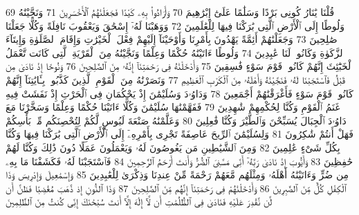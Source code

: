 {\tiny\colorbox{cl_aya}{69}} قُلْنَا يَٰنَارُ كُونِى بَرْدًا وَسَلَٰمًا عَلَىٰٓ إِبْرَٰهِيمَ
{\tiny\colorbox{cl_aya}{70}} وَأَرَادُوا۟ بِهِۦ كَيْدًا فَجَعَلْنَٰهُمُ ٱلْأَخْسَرِينَ
{\tiny\colorbox{cl_aya}{71}} وَنَجَّيْنَٰهُ وَلُوطًا إِلَى ٱلْأَرْضِ ٱلَّتِى بَٰرَكْنَا فِيهَا لِلْعَٰلَمِينَ
{\tiny\colorbox{cl_aya}{72}} وَوَهَبْنَا لَهُۥٓ إِسْحَٰقَ وَيَعْقُوبَ نَافِلَةً وَكُلًّا جَعَلْنَا صَٰلِحِينَ
{\tiny\colorbox{cl_aya}{73}} وَجَعَلْنَٰهُمْ أَئِمَّةً يَهْدُونَ بِأَمْرِنَا وَأَوْحَيْنَآ إِلَيْهِمْ فِعْلَ ٱلْخَيْرَٰتِ وَإِقَامَ ٱلصَّلَوٰةِ وَإِيتَآءَ ٱلزَّكَوٰةِ وَكَانُوا۟ لَنَا عَٰبِدِينَ
{\tiny\colorbox{cl_aya}{74}} وَلُوطًا ءَاتَيْنَٰهُ حُكْمًا وَعِلْمًا وَنَجَّيْنَٰهُ مِنَ ٱلْقَرْيَةِ ٱلَّتِى كَانَت تَّعْمَلُ ٱلْخَبَٰٓئِثَ إِنَّهُمْ كَانُوا۟ قَوْمَ سَوْءٍ فَٰسِقِينَ
{\tiny\colorbox{cl_aya}{75}} وَأَدْخَلْنَٰهُ فِى رَحْمَتِنَآ إِنَّهُۥ مِنَ ٱلصَّٰلِحِينَ
{\tiny\colorbox{cl_aya}{76}} وَنُوحًا إِذْ نَادَىٰ مِن قَبْلُ فَٱسْتَجَبْنَا لَهُۥ فَنَجَّيْنَٰهُ وَأَهْلَهُۥ مِنَ ٱلْكَرْبِ ٱلْعَظِيمِ
{\tiny\colorbox{cl_aya}{77}} وَنَصَرْنَٰهُ مِنَ ٱلْقَوْمِ ٱلَّذِينَ كَذَّبُوا۟ بِـَٔايَٰتِنَآ إِنَّهُمْ كَانُوا۟ قَوْمَ سَوْءٍ فَأَغْرَقْنَٰهُمْ أَجْمَعِينَ
{\tiny\colorbox{cl_aya}{78}} وَدَاوُۥدَ وَسُلَيْمَٰنَ إِذْ يَحْكُمَانِ فِى ٱلْحَرْثِ إِذْ نَفَشَتْ فِيهِ غَنَمُ ٱلْقَوْمِ وَكُنَّا لِحُكْمِهِمْ شَٰهِدِينَ
{\tiny\colorbox{cl_aya}{79}} فَفَهَّمْنَٰهَا سُلَيْمَٰنَ وَكُلًّا ءَاتَيْنَا حُكْمًا وَعِلْمًا وَسَخَّرْنَا مَعَ دَاوُۥدَ ٱلْجِبَالَ يُسَبِّحْنَ وَٱلطَّيْرَ وَكُنَّا فَٰعِلِينَ
{\tiny\colorbox{cl_aya}{80}} وَعَلَّمْنَٰهُ صَنْعَةَ لَبُوسٍ لَّكُمْ لِتُحْصِنَكُم مِّنۢ بَأْسِكُمْ فَهَلْ أَنتُمْ شَٰكِرُونَ
{\tiny\colorbox{cl_aya}{81}} وَلِسُلَيْمَٰنَ ٱلرِّيحَ عَاصِفَةً تَجْرِى بِأَمْرِهِۦٓ إِلَى ٱلْأَرْضِ ٱلَّتِى بَٰرَكْنَا فِيهَا وَكُنَّا بِكُلِّ شَىْءٍ عَٰلِمِينَ
{\tiny\colorbox{cl_aya}{82}} وَمِنَ ٱلشَّيَٰطِينِ مَن يَغُوصُونَ لَهُۥ وَيَعْمَلُونَ عَمَلًا دُونَ ذَٰلِكَ وَكُنَّا لَهُمْ حَٰفِظِينَ
{\tiny\colorbox{cl_aya}{83}} وَأَيُّوبَ إِذْ نَادَىٰ رَبَّهُۥٓ أَنِّى مَسَّنِىَ ٱلضُّرُّ وَأَنتَ أَرْحَمُ ٱلرَّٰحِمِينَ
{\tiny\colorbox{cl_aya}{84}} فَٱسْتَجَبْنَا لَهُۥ فَكَشَفْنَا مَا بِهِۦ مِن ضُرٍّ وَءَاتَيْنَٰهُ أَهْلَهُۥ وَمِثْلَهُم مَّعَهُمْ رَحْمَةً مِّنْ عِندِنَا وَذِكْرَىٰ لِلْعَٰبِدِينَ
{\tiny\colorbox{cl_aya}{85}} وَإِسْمَٰعِيلَ وَإِدْرِيسَ وَذَا ٱلْكِفْلِ كُلٌّ مِّنَ ٱلصَّٰبِرِينَ
{\tiny\colorbox{cl_aya}{86}} وَأَدْخَلْنَٰهُمْ فِى رَحْمَتِنَآ إِنَّهُم مِّنَ ٱلصَّٰلِحِينَ
{\tiny\colorbox{cl_aya}{87}} وَذَا ٱلنُّونِ إِذ ذَّهَبَ مُغَٰضِبًا فَظَنَّ أَن لَّن نَّقْدِرَ عَلَيْهِ فَنَادَىٰ فِى ٱلظُّلُمَٰتِ أَن لَّآ إِلَٰهَ إِلَّآ أَنتَ سُبْحَٰنَكَ إِنِّى كُنتُ مِنَ ٱلظَّٰلِمِينَ
